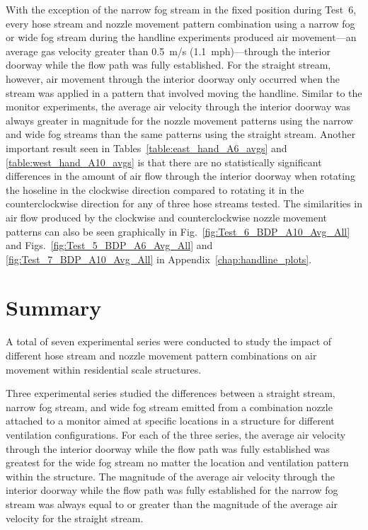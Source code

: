\documentclass[12pt,oneside]{book}
\begin{document}
\FloatBarrier

With the exception of the narrow fog stream in the fixed position during Test~6, every hose stream and nozzle movement pattern combination using a narrow fog or wide fog stream during the handline experiments produced air movement---an average gas velocity greater than 0.5~m/s (1.1~mph)---through the interior doorway while the flow path was fully established. For the straight stream, however, air movement through the interior doorway only occurred when the stream was applied in a pattern that involved moving the handline. Similar to the monitor experiments, the average air velocity through the interior doorway was always greater in magnitude for the nozzle movement patterns using the narrow and wide fog streams than the same patterns using the straight stream. Another important result seen in Tables~\ref{table:east_hand_A6_avgs} and \ref{table:west_hand_A10_avgs} is that there are no statistically significant differences in the amount of air flow through the interior doorway when rotating the hoseline in the clockwise direction compared to rotating it in the counterclockwise direction for any of three hose streams tested. The similarities in air flow produced by the clockwise and counterclockwise nozzle movement patterns can also be seen graphically in Fig.~\ref{fig:Test_6_BDP_A10_Avg_All} and Figs.~\ref{fig:Test_5_BDP_A6_Avg_All} and \ref{fig:Test_7_BDP_A10_Avg_All} in Appendix~\ref{chap:handline_plots}. 


\chapter{Summary}
\label{chap:summary}

A total of seven experimental series were conducted to study the impact of different hose stream and nozzle movement pattern combinations on air movement within residential scale structures. 

Three experimental series studied the differences between a straight stream, narrow fog stream, and wide fog stream emitted from a combination nozzle attached to a monitor aimed at specific locations in a structure for different ventilation configurations. For each of the three series, the average air velocity through the interior doorway while the flow path was fully established was greatest for the wide fog stream no matter the location and ventilation pattern within the structure. The magnitude of the average air velocity through the interior doorway while the flow path was fully established for the narrow fog stream was always equal to or greater than the magnitude of the average air velocity for the straight stream. 
\end{document}
